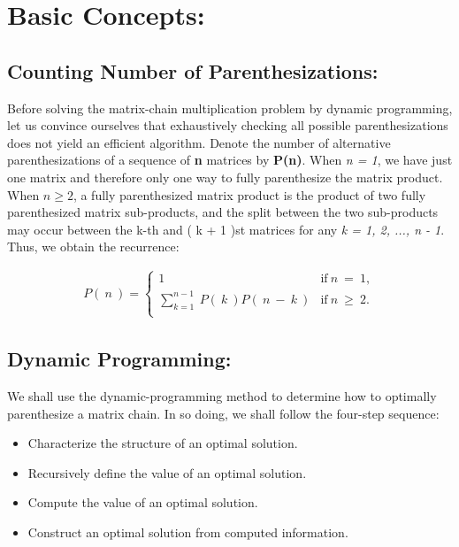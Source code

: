 \section{Basic Concepts:}

\subsection{Counting Number of Parenthesizations:}

Before solving the matrix-chain multiplication problem by dynamic programming, let us convince ourselves that exhaustively checking all possible parenthesizations does not yield an efficient algorithm. Denote the number of alternative parenthesizations of a sequence of {\bfseries n} matrices by {\bfseries P(n)}. When {\itshape n = 1}, we have just one matrix and therefore only one way to fully parenthesize the matrix product. When $n \geq 2$, a fully parenthesized matrix product is the product of two fully parenthesized matrix sub-products, and the split between the two sub-products may occur between the k-th and ( k + 1 )st matrices for any {\itshape k = 1, 2, ..., n - 1}. Thus, we obtain the recurrence: \hfill \break

\begin{ceqn}
\begin{align}
P(\ n\ ) = \left\{
\begin{array}{ll}
1 & \mathrm {if\ } n\ =\ 1, \\
\sum_{k = 1}^{n - 1}\ P(\ k\ )P(\ n\ -\ k\ ) & \mathrm {if\ } n\ \geq\ 2.\\
\end{array}
\right.
\end{align}
\end{ceqn}

\subsection{Dynamic Programming:}

We shall use the dynamic-programming method to determine how to optimally parenthesize a matrix chain. In so doing, we shall follow the four-step sequence:

\begin{itemize}
\item Characterize the structure of an optimal solution.
\item Recursively define the value of an optimal solution.
\item Compute the value of an optimal solution.
\item Construct an optimal solution from computed information.
\end{itemize}

\pagebreak